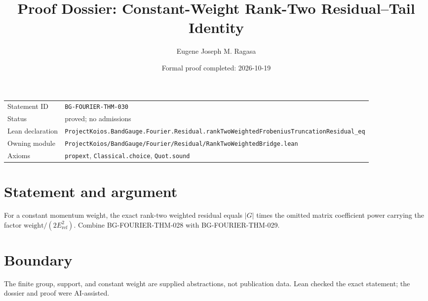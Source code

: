 \documentclass[11pt]{article}
\title{Proof Dossier: Constant-Weight Rank-Two Residual--Tail Identity}
\author{Eugene Joseph M. Ragasa}
\date{Formal proof completed: 2026-10-19}
\begin{document}
\maketitle
\noindent\begin{tabularx}{\textwidth}{@{}lX@{}}\toprule
Statement ID & \texttt{BG-FOURIER-THM-030} \\
Status & proved; no admissions \\
Lean declaration & \texttt{ProjectKoios.BandGauge.Fourier.Residual.}\newline\texttt{rankTwoWeightedFrobeniusTruncationResidual\_eq} \\
Owning module & \texttt{ProjectKoios/BandGauge/Fourier/Residual/RankTwoWeightedBridge.lean} \\
Axioms & \texttt{propext}, \texttt{Classical.choice}, \texttt{Quot.sound} \\
\bottomrule\end{tabularx}
\section{Statement and argument}
For a constant momentum weight, the exact rank-two weighted residual equals $|G|$ times the omitted matrix coefficient power carrying the factor $\mathrm{weight}/(2E_{\mathrm{ref}}^2)$. Combine BG-FOURIER-THM-028 with BG-FOURIER-THM-029.
\section{Boundary}
The finite group, support, and constant weight are supplied abstractions, not publication data. Lean checked the exact statement; the dossier and proof were AI-assisted.
\end{document}
